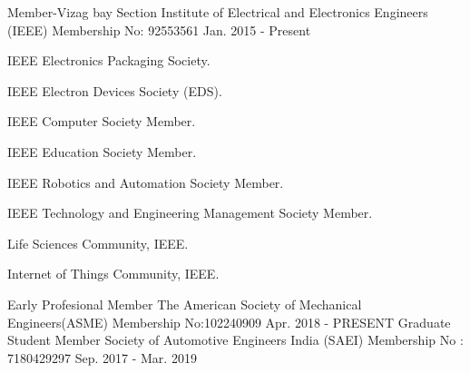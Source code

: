 \begin{cventries}
{\begin{cvitems}
\end{cvitems}
}
  \cventry
    { Member-Vizag bay  Section}
    {Institute of Electrical and Electronics Engineers (IEEE)}
    {Membership No: 92553561}
    {Jan. 2015 - Present}
    {
      \begin{cvitems}
	\item {IEEE Electronics Packaging Society.}
	\item {IEEE Electron Devices Society (EDS).}
        \item {IEEE Computer Society Member.}
        \item {IEEE Education Society Member.}
        \item {IEEE Robotics and Automation Society Member.}
        \item {IEEE Technology and Engineering Management Society Member.}
        \item {Life Sciences Community, IEEE.}
        \item {Internet of Things Community, IEEE.}
      \end{cvitems}
    }
  
  \cventry
    {Early Profesional Member}
    {The American Society of Mechanical Engineers(ASME)}
    {Membership No:102240909}
    {Apr. 2018 - PRESENT}
{
}
  \cventry
    {Graduate Student Member}
    {Society of Automotive Engineers India (SAEI)}
    {Membership No : 7180429297}
    {Sep. 2017 - Mar. 2019}
{
 \begin{cvitems}
\end{cvitems}
}
\end{cventries}
